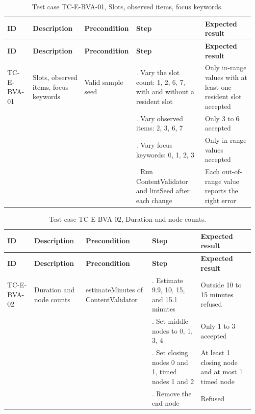 {\small
\begin{longtable}{|>{\raggedright\arraybackslash}p{}|>{\raggedright\arraybackslash}p{}|>{\raggedright\arraybackslash}p{}|>{\raggedright\arraybackslash}p{}|>{\raggedright\arraybackslash}p{}|}
\caption{Test case TC-E-BVA-01, Slots, observed items, focus keywords.} \\
\hline
\textbf{ID} & \textbf{Description} & \textbf{Precondition} & \textbf{Step} & \textbf{Expected result} \\ \hline
\endfirsthead
\hline
\textbf{ID} & \textbf{Description} & \textbf{Precondition} & \textbf{Step} & \textbf{Expected result} \\ \hline
\endhead
TC-E-BVA-01 & Slots, observed items, focus keywords & Valid sample seed & 1. Vary the slot count: 1, 2, 6, 7, with and without a resident slot & Only in-range values with at least one resident slot accepted \\ \hline
 &  &  & 2. Vary observed items: 2, 3, 6, 7 & Only 3 to 6 accepted \\ \hline
 &  &  & 3. Vary focus keywords: 0, 1, 2, 3 & Only in-range values accepted \\ \hline
 &  &  & 4. Run ContentValidator and lintSeed after each change & Each out-of-range value reports the right error \\ \hline
\end{longtable}
}

{\small
\begin{longtable}{|>{\raggedright\arraybackslash}p{}|>{\raggedright\arraybackslash}p{}|>{\raggedright\arraybackslash}p{}|>{\raggedright\arraybackslash}p{}|>{\raggedright\arraybackslash}p{}|}
\caption{Test case TC-E-BVA-02, Duration and node counts.} \\
\hline
\textbf{ID} & \textbf{Description} & \textbf{Precondition} & \textbf{Step} & \textbf{Expected result} \\ \hline
\endfirsthead
\hline
\textbf{ID} & \textbf{Description} & \textbf{Precondition} & \textbf{Step} & \textbf{Expected result} \\ \hline
\endhead
TC-E-BVA-02 & Duration and node counts & estimateMinutes of ContentValidator & 1. Estimate 9.9, 10, 15, and 15.1 minutes & Outside 10 to 15 minutes refused \\ \hline
 &  &  & 2. Set middle nodes to 0, 1, 3, 4 & Only 1 to 3 accepted \\ \hline
 &  &  & 3. Set closing nodes 0 and 1, timed nodes 1 and 2 & At least 1 closing node and at most 1 timed node \\ \hline
 &  &  & 4. Remove the end node & Refused \\ \hline
\end{longtable}
}

